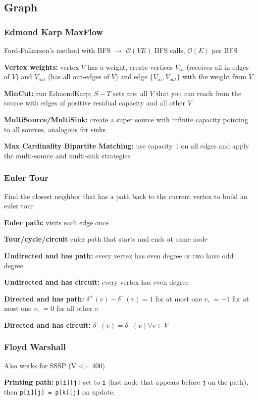 \documentclass[12pt, a4paper, twoside]{article}
\begin{document}
\subsection{Graph}
\subsubsection{Edmond Karp MaxFlow}
Ford-Fulkerson's method with BFS $\to$ $\mathcal{O}(VE)$ BFS calls, $\mathcal{O}(E)$ per BFS

\textbf{Vertex weights:} vertex $V$ has a weight, create vertices $V_{in}$ (receives all in-edges of $V$) and $V_{out}$ (has all out-edges of $V$) and edge $\{V_{in}, V_{out}\}$ with the weight from $V$

\textbf{MinCut:} run EdmondKarp; $S-T$ sets are: all $V$ that you can reach from the source with edges of positive residual capacity and all other $V$

\textbf{MultiSource/MultiSink:} create a super source with infinite capacity pointing to all sources, analogous for sinks

\textbf{Max Cardinality Bipartite Matching:} use capacity 1 on all edges and apply the multi-source and multi-sink strategies

\subsubsection{Euler Tour}
Find the closest neighbor that has a path back to the current vertex to build an euler tour

\textbf{Euler path:} visits each edge once

\textbf{Tour/cycle/circuit} euler path that starts and ends at same node

\textbf{Undirected and has path:} every vertex has even degree or two have odd degree

\textbf{Undirected and has circuit:} every vertex has even degree

\textbf{Directed and has path:} $\delta^{+}(v) - \delta^{-}(v) = 1$ for at most one $v$, $= -1$ for at most one $v$, $= 0$ for all other $v$

\textbf{Directed and has circuit:} $\delta^{+}(v) = \delta^{-}(v) \forall v \in V$

\subsubsection{Floyd Warshall}
Also works for SSSP (V <= 400)

\textbf{Printing path:} \texttt{p[i][j]} set to \texttt{i} (last node that appears before \texttt{j} on the path), then \texttt{p[i][j] = p[k][j]} on update.
\end{document}
